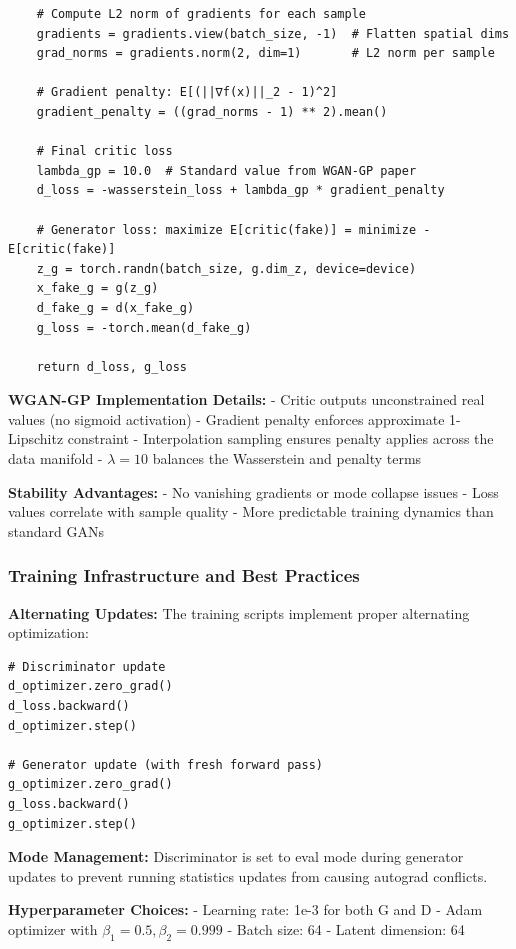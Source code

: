 \documentclass{article}
\begin{document}
\begin{verbatim}
    # Compute L2 norm of gradients for each sample
    gradients = gradients.view(batch_size, -1)  # Flatten spatial dims
    grad_norms = gradients.norm(2, dim=1)       # L2 norm per sample

    # Gradient penalty: E[(||∇f(x)||_2 - 1)^2]
    gradient_penalty = ((grad_norms - 1) ** 2).mean()

    # Final critic loss
    lambda_gp = 10.0  # Standard value from WGAN-GP paper
    d_loss = -wasserstein_loss + lambda_gp * gradient_penalty

    # Generator loss: maximize E[critic(fake)] = minimize -E[critic(fake)]
    z_g = torch.randn(batch_size, g.dim_z, device=device)
    x_fake_g = g(z_g)
    d_fake_g = d(x_fake_g)
    g_loss = -torch.mean(d_fake_g)

    return d_loss, g_loss
\end{verbatim}

\textbf{WGAN-GP Implementation Details:}
- Critic outputs unconstrained real values (no sigmoid activation)
- Gradient penalty enforces approximate 1-Lipschitz constraint
- Interpolation sampling ensures penalty applies across the data manifold
- $\lambda = 10$ balances the Wasserstein and penalty terms

\textbf{Stability Advantages:}
- No vanishing gradients or mode collapse issues
- Loss values correlate with sample quality
- More predictable training dynamics than standard GANs

\subsubsection{Training Infrastructure and Best Practices}

\textbf{Alternating Updates:} The training scripts implement proper alternating optimization:
\begin{verbatim}
# Discriminator update
d_optimizer.zero_grad()
d_loss.backward()
d_optimizer.step()

# Generator update (with fresh forward pass)
g_optimizer.zero_grad()
g_loss.backward()
g_optimizer.step()
\end{verbatim}

\textbf{Mode Management:} Discriminator is set to eval mode during generator updates to prevent running statistics updates from causing autograd conflicts.

\textbf{Hyperparameter Choices:}
- Learning rate: 1e-3 for both G and D
- Adam optimizer with $\beta_1 = 0.5, \beta_2 = 0.999$
- Batch size: 64
- Latent dimension: 64
\end{document}
